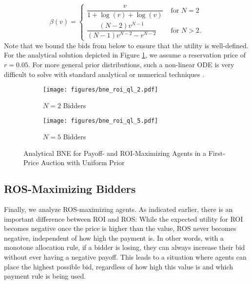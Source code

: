 \documentclass{article}
\begin{document}
\begin{equation}
	\beta(v) = 
	\begin{cases}
		\dfrac{v}{1 + \log(r) + \log(v)} &\text{ for } N = 2 \\[10pt]
		\dfrac{(N-2)v^{N-1}}{(N-1)v^{N-2} - r^{N-2}} &\text{ for } N > 2.
	\end{cases}
\end{equation}
Note that we bound the bids from below to ensure that the utility is well-defined. For the analytical solution depicted in Figure \ref{fig:analytical_QL_ROI_uniform}, we assume a reservation price of $r=0.05$. 
For more general prior distributions, such a non-linear ODE is very difficult to solve with standard analytical or numerical techniques \citep{bichler2023soda}. 

\begin{figure}[h]
	\begin{center}
	\begin{subfigure}{0.45\textwidth}
		\centering
		\texttt{[image: figures/bne\_roi\_ql\_2.pdf]}
		\caption{$N=2$ Bidders}
	\end{subfigure}
	\begin{subfigure}{0.45\textwidth}
		\centering
		\texttt{[image: figures/bne\_roi\_ql\_5.pdf]}
		\caption{$N=5$ Bidders}
	\end{subfigure}
	\caption{Analytical BNE for Payoff- and ROI-Maximizing Agents in a First-Price Auction with Uniform Prior}
	\label{fig:analytical_QL_ROI_uniform}
	\end{center}
\end{figure}

\subsection{ROS-Maximizing Bidders}
Finally, we analyze ROS-maximizing agents. As indicated earlier, there is an important difference between ROI and ROS: While the expected utility for ROI becomes negative once the price is higher than the value, ROS never becomes negative, independent of how high the payment is. In other words, with a monotone allocation rule, if a bidder is losing, they can always increase their bid without ever having a negative payoff. This leads to a situation where agents can place the highest possible bid, regardless of how high this value is and which payment rule is being used. 
\end{document}
